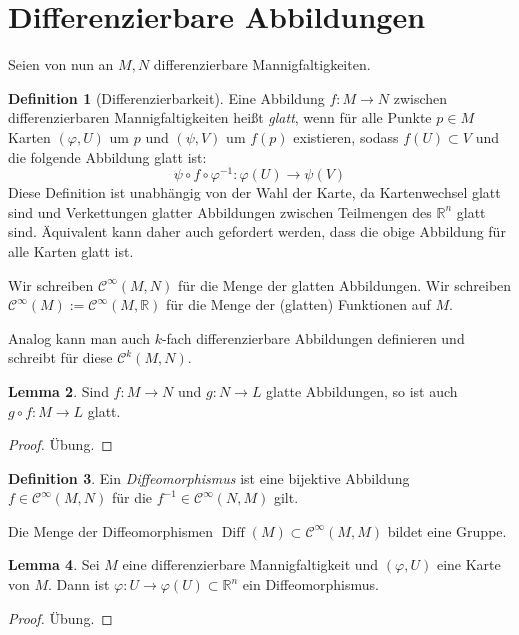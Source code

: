\documentclass[a4paper]{scrreprt}
\numberwithin{equation}{chapter}
\DeclareMathOperator{\Diff}{Diff}
\newcommand{\R}{\mathbb{R}}
\newcommand{\sC}{\mathcal{C}^{\infty}}
\theoremstyle{definition}
\newtheorem{defn}{Definition}[section]
\newtheorem{lemma}[defn]{Lemma}
\newcommand{\bewUeb}{\begin{proof}Übung.\end{proof}}
\begin{document}
	\section{Differenzierbare Abbildungen}
		Seien von nun an $M,N$ differenzierbare Mannigfaltigkeiten.
		\begin{defn}[Differenzierbarkeit]
			Eine Abbildung $f\colon M\rightarrow N$ zwischen differenzierbaren Mannigfaltigkeiten heißt \emph{glatt}, wenn für alle Punkte $p\in M$ Karten $(\varphi,U)$ um  $p$ und $(\psi,V)$ um $f(p)$ existieren, sodass $f(U)\subset V$ und die folgende Abbildung glatt ist:
			\begin{equation}
				\psi\circ f \circ \varphi^{-1}\colon \varphi(U)\rightarrow \psi(V)
			\end{equation}
			Diese Definition ist unabhängig von der Wahl der Karte, da Kartenwechsel glatt sind und Verkettungen glatter Abbildungen zwischen Teilmengen des $\R^n$ glatt sind. Äquivalent kann daher auch gefordert werden, dass die obige Abbildung für alle Karten glatt ist.

			Wir schreiben $\sC(M,N)$ für die Menge der glatten Abbildungen. Wir schreiben $\sC(M) := \sC(M,\R)$ für die Menge der (glatten) Funktionen auf $M$.
			
			Analog kann man auch $k$-fach differenzierbare Abbildungen definieren und schreibt für diese $\mathcal{C}^k(M,N)$.
		\end{defn}
		\begin{lemma}
			Sind $f\colon M\to N$ und $g\colon N \to L$ glatte Abbildungen, so ist auch $g\circ f \colon M \to L$ glatt.
			\bewUeb
		\end{lemma}
		\begin{defn}
			Ein \emph{Diffeomorphismus} ist eine bijektive Abbildung $f\in\sC(M,N)$ für die $f^{-1}\in\sC(N,M)$ gilt.

			Die Menge der Diffeomorphismen $\Diff(M)\subset\sC(M,M)$ bildet eine Gruppe.
		\end{defn}
		\begin{lemma} \label{lemma:karte_diffeo}
			Sei $M$ eine differenzierbare Mannigfaltigkeit und $(\varphi,U)$ eine Karte von $M$. Dann ist $\varphi\colon U \to \varphi(U) \subset \R^n$ ein Diffeomorphismus.
			\bewUeb
		\end{lemma}


\end{document}

